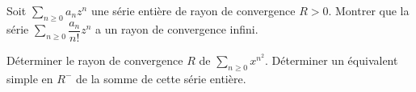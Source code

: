 \documentclass[a4paper,twoside,french,11pt]{VcCours}
\newcommand{\dx}{\text{d}x}
\newcommand{\Sum}[2]{\sum_{#1}^{#2}}
\begin{document}

\begin{Exercice}[$\bigstar$]{} Soit $\Sum{n \geq 0}{} a_n z^n$ une série entière de rayon de convergence $R>0$. Montrer que  la série $\Sum{n \geq 0}{} \dfrac{a_n}{n!}z^n$ a un rayon de convergence infini. 
\end{Exercice}


\begin{Exercice}[$\bigstar$]{} Déterminer le rayon de convergence $R$ de $\sum_{n \geq 0} x^{n^2}$. Déterminer un équivalent simple en $R^{-}$ de la somme de cette série entière.
\end{Exercice}
\end{document}
